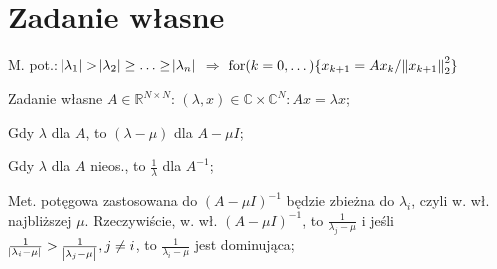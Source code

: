 \section{Zadanie własne}

\entry
M. pot.:
$\abs{\lambda_1}>\abs{\lambda_2}\geq\ldots\geq\abs{\lambda_n}$
$\Rightarrow$
$\mathrm{for}(k=0,\dots)\{x_{k+1}=Ax_k / \norm{x_{k+1}}^2_2\}$

\entry
Zadanie własne $A \in \mathbb{R}^{N \times N}$:
$(\lambda,x) \in \mathbb{C} \times \mathbb{C}^N: Ax = \lambda x$;

\entry
Gdy $\lambda$ dla $A$, to $(\lambda - \mu)$ dla $A-\mu I$;

\entry
Gdy $\lambda$ dla $A$ nieos., to $\frac{1}{\lambda}$ dla $A^{-1}$;

\entry
Met. potęgowa zastosowana do
$(A-\mu I)^{-1}$
będzie zbieżna do
$\lambda_i$,
czyli w. wł. najbliższej $\mu$.
Rzeczywiście, w. wł.
$(A-\mu I)^{-1}$,
to
$\frac{1}{\lambda_j-\mu}$
i jeśli
$\frac{1}{\abs{\lambda_i-\mu}} > \frac{1}{\abs{\lambda_j-\mu}}, j\neq i$,
to
$\frac{1}{\lambda_i-\mu}$
jest dominująca;







